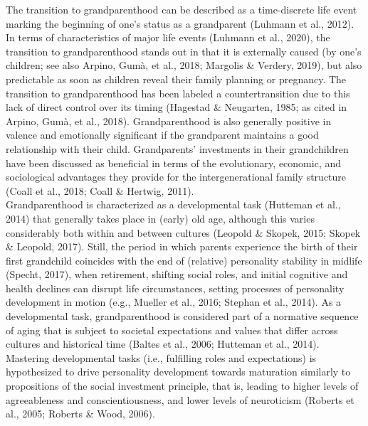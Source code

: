 \documentclass[
  english,
  man,floatsintext]{apa7}
\begin{document}
The transition to grandparenthood can be described as a time-discrete life event marking the beginning of one's status as a grandparent (Luhmann et al., 2012). In terms of characteristics of major life events (Luhmann et al., 2020), the transition to grandparenthood stands out in that it is externally caused (by one's children; see also Arpino, Gumà, et al., 2018; Margolis \& Verdery, 2019), but also predictable as soon as children reveal their family planning or pregnancy. The transition to grandparenthood has been labeled a countertransition due to this lack of direct control over its timing (Hagestad \& Neugarten, 1985; as cited in Arpino, Gumà, et al., 2018). Grandparenthood is also generally positive in valence and emotionally significant if the grandparent maintains a good relationship with their child. Grandparents' investments in their grandchildren have been discussed as beneficial in terms of the evolutionary, economic, and sociological advantages they provide for the intergenerational family structure (Coall et al., 2018; Coall \& Hertwig, 2011).\\
Grandparenthood is characterized as a developmental task (Hutteman et al., 2014) that generally takes place in (early) old age, although this varies considerably both within and between cultures (Leopold \& Skopek, 2015; Skopek \& Leopold, 2017). Still, the period in which parents experience the birth of their first grandchild coincides with the end of (relative) personality stability in midlife (Specht, 2017), when retirement, shifting social roles, and initial cognitive and health declines can disrupt life circumstances, setting processes of personality development in motion (e.g., Mueller et al., 2016; Stephan et al., 2014). As a developmental task, grandparenthood is considered part of a normative sequence of aging that is subject to societal expectations and values that differ across cultures and historical time (Baltes et al., 2006; Hutteman et al., 2014). Mastering developmental tasks (i.e., fulfilling roles and expectations) is hypothesized to drive personality development towards maturation similarly to propositions of the social investment principle, that is, leading to higher levels of agreeableness and conscientiousness, and lower levels of neuroticism (Roberts et al., 2005; Roberts \& Wood, 2006).\\
\end{document}
